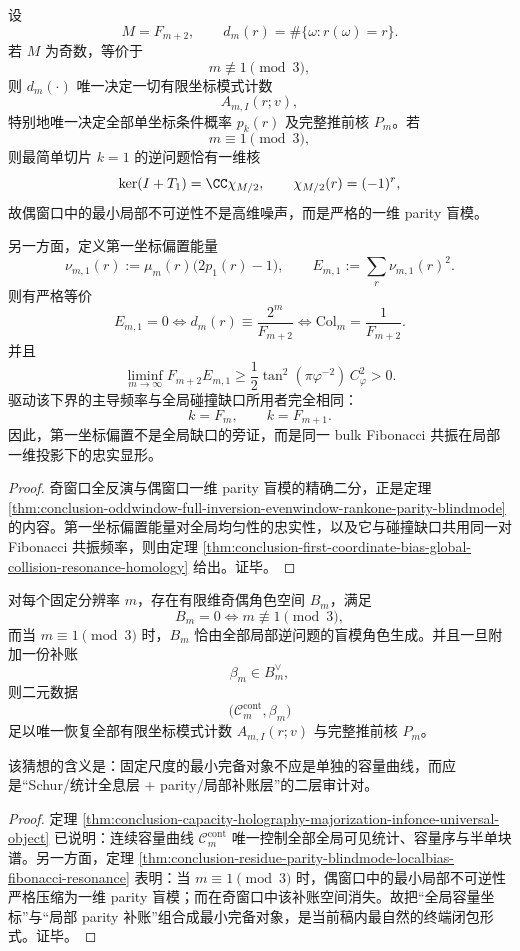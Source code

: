 \begin{theorem}\label{thm:conclusion-residue-parity-blindmode-localbias-fibonacci-resonance}
设
\[
M=F_{m+2},
\qquad
d_m(r)=\#\{\omega:r(\omega)=r\}.
\]
若 \(M\) 为奇数，等价于
\[
m\not\equiv 1\pmod 3,
\]
则 \(d_m(\cdot)\) 唯一决定一切有限坐标模式计数
\[
A_{m,I}(r;v),
\]
特别地唯一决定全部单坐标条件概率 \(p_k(r)\) 及完整推前核 \(P_m\)。若
\[
m\equiv 1\pmod 3,
\]
则最简单切片 \(k=1\) 的逆问题恰有一维核
\[
\ker(I+T_1)=\CC\chi_{M/2},
\qquad
\chi_{M/2}(r)=(-1)^r,
\]
故偶窗口中的最小局部不可逆性不是高维噪声，而是严格的一维 parity 盲模。

另一方面，定义第一坐标偏置能量
\[
\nu_{m,1}(r):=\mu_m(r)\bigl(2p_1(r)-1\bigr),
\qquad
E_{m,1}:=\sum_r \nu_{m,1}(r)^2.
\]
则有严格等价
\[
E_{m,1}=0
\iff
d_m(r)\equiv \frac{2^m}{F_{m+2}}
\iff
\mathrm{Col}_m=\frac1{F_{m+2}}.
\]
并且
\[
\liminf_{m\to\infty}F_{m+2}E_{m,1}
\ge
\frac12\tan^2(\pi\varphi^{-2})\,C_\varphi^2>0.
\]
驱动该下界的主导频率与全局碰撞缺口所用者完全相同：
\[
k=F_m,\qquad k=F_{m+1}.
\]
因此，第一坐标偏置不是全局缺口的旁证，而是同一 bulk Fibonacci 共振在局部一维投影下的忠实显形。
\end{theorem}
\begin{proof}
奇窗口全反演与偶窗口一维 parity 盲模的精确二分，正是定理 \ref{thm:conclusion-oddwindow-full-inversion-evenwindow-rankone-parity-blindmode} 的内容。第一坐标偏置能量对全局均匀性的忠实性，以及它与碰撞缺口共用同一对 Fibonacci 共振频率，则由定理 \ref{thm:conclusion-first-coordinate-bias-global-collision-resonance-homology} 给出。证毕。
\end{proof}

\begin{conjecture}\label{conj:conclusion-binfold-minimal-complete-object-capacity-plus-parity-ledger}
对每个固定分辨率 \(m\)，存在有限维奇偶角色空间 \(B_m\)，满足
\[
B_m=0\iff m\not\equiv 1\pmod 3,
\]
而当 \(m\equiv 1\pmod 3\) 时，\(B_m\) 恰由全部局部逆问题的盲模角色生成。并且一旦附加一份补账
\[
\beta_m\in B_m^\vee,
\]
则二元数据
\[
\bigl(\mathcal C_m^{\mathrm{cont}},\beta_m\bigr)
\]
足以唯一恢复全部有限坐标模式计数 \(A_{m,I}(r;v)\) 与完整推前核 \(P_m\)。

该猜想的含义是：固定尺度的最小完备对象不应是单独的容量曲线，而应是“Schur/统计全息层 + parity/局部补账层”的二层审计对。
\end{conjecture}
\begin{proof}
定理 \ref{thm:conclusion-capacity-holography-majorization-infonce-universal-object} 已说明：连续容量曲线 \(\mathcal C_m^{\mathrm{cont}}\) 唯一控制全部全局可见统计、容量序与半单块谱。另一方面，定理 \ref{thm:conclusion-residue-parity-blindmode-localbias-fibonacci-resonance} 表明：当 \(m\equiv 1\pmod 3\) 时，偶窗口中的最小局部不可逆性严格压缩为一维 parity 盲模；而在奇窗口中该补账空间消失。故把“全局容量坐标”与“局部 parity 补账”组合成最小完备对象，是当前稿内最自然的终端闭包形式。证毕。
\end{proof}

